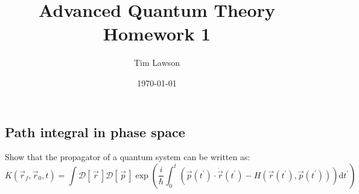 \documentclass[a4paper]{extarticle}
\title{Advanced Quantum Theory\\
\large Homework 1}
\author{Tim Lawson}
\date{\today}
\newcommand{\tp}{t^\prime}
\newcommand{\dtp}{\text{d}\tp}
\newcommand{\func}[2]{\mathcal{#1}\left[\,#2\,\right]}
\newcommand{\ihbar}{\frac{i}{\hbar}}
\newcommand{\propagator}{K(\vec{r}_f, \vec{r}_0, t)}
\begin{document}
\maketitle

\setcounter{section}{2}
\subsection{Path integral in phase space}

Show that the propagator of a quantum system can be written as:
\begin{equation}
  \label{result}
  \propagator = \int\func{D}{\vec{r}}\func{D}{\vec{p}}\exp\left(
  \ihbar\int_{0}^{t}\left(
  \vec{p}(\tp) \cdot \dot{\vec{r}}(\tp) - H(\vec{r}(\tp), \vec{p}(\tp))
  \right)\dtp
  \right)
\end{equation}
\end{document}
